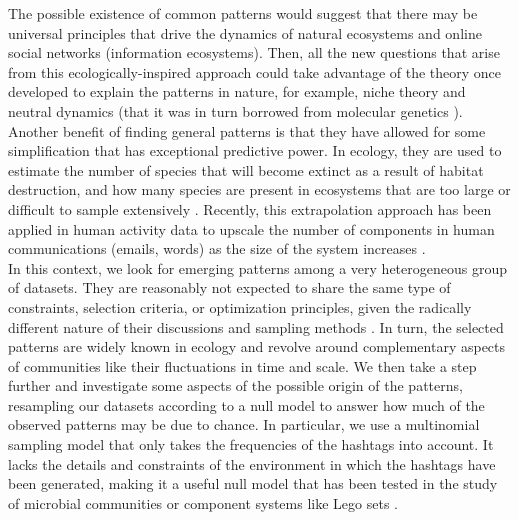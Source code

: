 The possible existence of common patterns would suggest that there may be universal principles that drive the dynamics of natural ecosystems and online social networks (information ecosystems). Then, all the new questions that arise from this ecologically-inspired approach could take advantage of the theory once developed to explain the patterns in nature, for example, niche theory \cite{hutchinson1957concluding} and neutral dynamics \cite{hubbell2001unified} (that it was in turn borrowed from molecular genetics \cite{kimura1983neutral}). Another benefit of finding general patterns is that they have allowed for some simplification that has exceptional predictive power. In ecology, they are used to estimate the number of species that will become extinct as a result of habitat destruction, and how many species are present in ecosystems that are too large or difficult to sample extensively \cite{brown1995macroecology}. Recently, this extrapolation approach has been applied in human activity data to upscale the number of components in human communications (emails, words) as the size of the system increases \cite{tovo2021upscaling}. \\

In this context, we look for emerging patterns among a very heterogeneous group of datasets. They are reasonably not expected to share the same type of constraints, selection criteria, or optimization principles, given the radically different nature of their discussions and sampling methods \cite{zubiaga2018}. In turn, the selected patterns are widely known in ecology and revolve around complementary aspects of communities like their fluctuations in time and scale. 
 We then take a step further and investigate some aspects of the possible origin of the patterns, resampling our datasets according to a null model to answer how much of the observed patterns may be due to chance. In particular, we use a multinomial sampling model that only takes the frequencies of the hashtags into account. It lacks the details and constraints of the environment in which the hashtags have been generated, making it a useful null model that has been tested in the study of microbial communities \cite{grilli2020macroecological} or component systems like Lego sets \cite{lego}.
 

